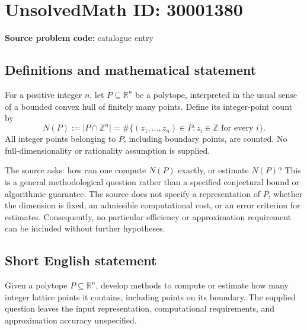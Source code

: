 \documentclass[11pt]{article}
\newcommand{\Z}{\mathbb{Z}}
\newcommand{\R}{\mathbb{R}}
\begin{document}
\section*{UnsolvedMath ID: 30001380}
\textbf{Source problem code:} catalogue entry
\subsection{Definitions and mathematical statement}
For a positive integer \(n\), let \(P\subseteq\R^n\) be a polytope, interpreted in the usual sense of a bounded convex hull of finitely many points. Define its integer-point count by
\[
N(P):=\lvert P\cap\Z^n\rvert
=\#\{(z_1,\ldots,z_n)\in P:z_i\in\Z\text{ for every }i\}.
\]
All integer points belonging to \(P\), including boundary points, are counted. No full-dimensionality or rationality assumption is supplied.

The source asks: how can one compute \(N(P)\) exactly, or estimate \(N(P)\)? This is a general methodological question rather than a specified conjectural bound or algorithmic guarantee. The source does not specify a representation of \(P\), whether the dimension is fixed, an admissible computational cost, or an error criterion for estimates. Consequently, no particular efficiency or approximation requirement can be included without further hypotheses.
\subsection{Short English statement}
Given a polytope \(P\subseteq\R^n\), develop methods to compute or estimate how many integer lattice points it contains, including points on its boundary. The supplied question leaves the input representation, computational requirements, and approximation accuracy unspecified.
\end{document}
